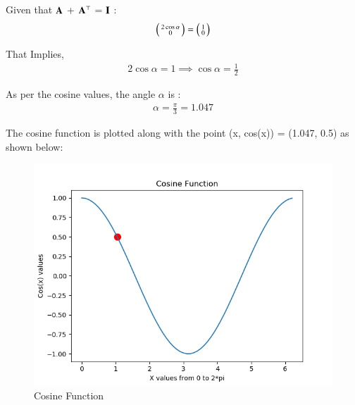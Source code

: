 \documentclass[journal,12pt,twocolumn]{IEEEtran}
\begin{document}
Given that  $\mathbf{A}$ + $\mathbf{A}^\top$ = $\mathbf{I}$ :
\begin{align}
  \begin{psmallmatrix} 2\cos{\alpha} \\ 0 \end{psmallmatrix} = \begin{psmallmatrix} 1 \\ 0 \end{psmallmatrix} 
\end{align}

That Implies, 
\begin{align}
 2\cos{\alpha} = 1 \implies \cos{\alpha} = \frac{1}{2}   
\end{align}

As per the cosine values, the angle $\alpha$ is :
\begin{align}
 \alpha =  \frac{\pi}{3} = 1.047
\end{align}
  
The cosine function is plotted along with the point (x, cos(x)) = (1.047, 0.5) as shown below:  
\begin{figure}[h]
    \centering
    \includegraphics[width=\columnwidth]{assignment_2.png}
    \caption{Cosine Function}
    \label{fig:cosine}
\end{figure}
\end{document}
